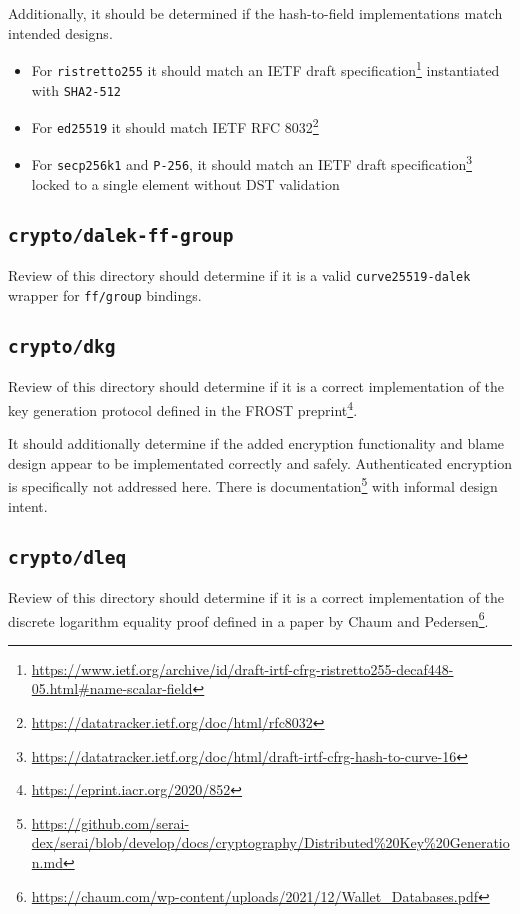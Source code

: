 \documentclass{article}
\begin{document}
Additionally, it should be determined if the hash-to-field implementations match intended designs.
\begin{itemize}
\item For \texttt{ristretto255} it should match an IETF draft specification\footnote{\url{https://www.ietf.org/archive/id/draft-irtf-cfrg-ristretto255-decaf448-05.html\#name-scalar-field}} instantiated with \texttt{SHA2-512}
\item For \texttt{ed25519} it should match IETF RFC 8032\footnote{\url{https://datatracker.ietf.org/doc/html/rfc8032}}
\item For \texttt{secp256k1} and \texttt{P-256}, it should match an IETF draft specification\footnote{\url{https://datatracker.ietf.org/doc/html/draft-irtf-cfrg-hash-to-curve-16}} locked to a single element without DST validation
\end{itemize}


\subsection{\texttt{crypto/dalek-ff-group}}

Review of this directory should determine if it is a valid \texttt{curve25519-dalek} wrapper for \texttt{ff/group} bindings.


\subsection{\texttt{crypto/dkg}}

Review of this directory should determine if it is a correct implementation of the key generation protocol defined in the FROST preprint\footnote{\url{https://eprint.iacr.org/2020/852}}.

It should additionally determine if the added encryption functionality and blame design appear to be implementated correctly and safely.
Authenticated encryption is specifically not addressed here.
There is documentation\footnote{\url{https://github.com/serai-dex/serai/blob/develop/docs/cryptography/Distributed\%20Key\%20Generation.md}} with informal design intent.


\subsection{\texttt{crypto/dleq}}

Review of this directory should determine if it is a correct implementation of the discrete logarithm equality proof defined in a paper by Chaum and Pedersen\footnote{\url{https://chaum.com/wp-content/uploads/2021/12/Wallet_Databases.pdf}}.
\end{document}
